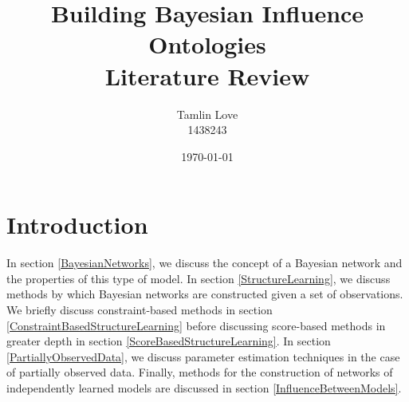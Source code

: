 \documentclass [11pt]{article}
\title{Building Bayesian Influence Ontologies\\Literature Review}
\author{Tamlin Love\\1438243}
\date{\today}
\begin{document}
\maketitle
\section{Introduction}
In section \ref{BayesianNetworks}, we discuss the concept of a Bayesian network and the properties of this type of model. In section \ref{StructureLearning}, we discuss methods by which Bayesian networks are constructed given a set of observations. We briefly discuss constraint-based methods in section \ref{ConstraintBasedStructureLearning} before discussing score-based methods in greater depth in section \ref{ScoreBasedStructureLearning}. In section \ref{PartiallyObservedData}, we discuss parameter estimation techniques in the case of partially observed data. Finally, methods for the construction of networks of independently learned models are discussed in section \ref{InfluenceBetweenModels}.
\end{document}
